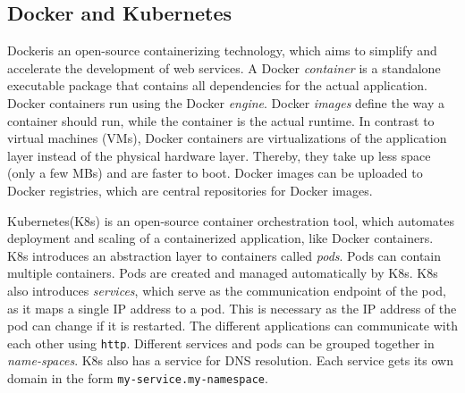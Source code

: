 \subsection{Docker and Kubernetes}
Docker\footnotemark is an open-source containerizing technology, which aims to simplify and accelerate the development of web services.
A Docker \emph{container} is a standalone executable package that contains all dependencies for the actual application. Docker containers run using the Docker \emph{engine}. Docker \emph{images} define the way a container should run, while the container is the actual runtime.
In contrast to virtual machines (VMs), Docker containers are virtualizations of the application layer instead of the physical hardware layer. Thereby, they take up less space (only a few MBs) and are faster to boot.
Docker images can be uploaded to Docker registries\footnotemark, which are central repositories for Docker images. 

Kubernetes\footnotemark (K8s) is an open-source container orchestration tool, which automates deployment and scaling of a containerized application, like Docker containers. 
K8s introduces an abstraction layer to containers called \emph{pods}. Pods can contain multiple containers. Pods are created and managed automatically by K8s. K8s also introduces \emph{services}, which serve as the communication endpoint of the pod, as it maps a single IP address to a pod. This is necessary as the IP address of the pod can change if it is restarted.
The different applications can communicate with each other using \texttt{http}. 
Different services and pods can be grouped together in \emph{name-spaces}.
K8s also has a service for DNS resolution. Each service gets its own domain in the form \texttt{my-service.my-namespace}.
